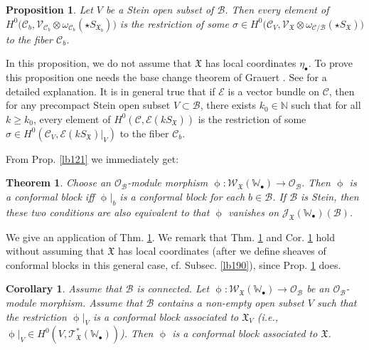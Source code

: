 \documentclass[12pt,a4paper,notitlepage]{article}
\theoremstyle{definition}
\theoremstyle{plain}
\newtheorem{thm}[df]{Theorem}
\newtheorem{pp}[df]{Proposition}
\newtheorem{co}[df]{Corollary}
\newcommand{\fk}{\mathfrak}
\newcommand{\mc}{\mathcal}
\newcommand{\scr}{\mathscr}
\newcommand{\SX}{{S_{\fk X}}}
\newcommand{\blt}{\bullet}
\newcommand{\Wbb}{\mathbb W}
\newcommand{\Nbb}{\mathbb N}
\newcommand{\SXb}{{S_{\fk X_b}}}
\numberwithin{equation}{section}
\begin{document}
\begin{pp}\label{lb122}
Let $V$ be a Stein open subset of $\mc B$. Then every element of $H^0\big(\mc C_b,\scr V_{\mc C_b}\otimes\omega_{\mc C_b}(\star\SXb)\big)$ is the restriction of some $\sigma\in H^0\big(\mc C_V,\scr V_{\fk X}\otimes\omega_{\mc C/\mc B}(\star\SX)\big)$ to the fiber $\mc C_b$.
\end{pp}


In this proposition, we do not assume that $\fk X$ has local coordinates $\eta_\blt$. To prove this proposition one needs the base change theorem of Grauert \cite[Sec. III.4.2]{GR-b}. See  \cite[Sec. 2.5]{Gui} for a detailed explanation. It is in general true that if $\scr E$ is a vector bundle on $\mc C$, then for any precompact Stein open subset $V\subset\mc B$, there exists $k_0\in\Nbb$ such that for all $k\geq k_0$, every element of $H^0(\mc C,\scr E(k\SX))$ is the restriction of some $\sigma \in H^0(\mc C_V,\scr E(k\SX)|_V)$ to the fiber $\mc C_b$.


From Prop. \ref{lb121} we immediately get:

\begin{thm}\label{lb143}
Choose an $\scr O_{\mc B}$-module morphism $\upphi:\scr W_{\fk X}(\Wbb_\blt)\rightarrow\scr O_{\mc B}$. Then $\upphi$ is a conformal block iff $\upphi|_b$ is a conformal block for each $b\in\mc B$. If $\mc B$ is Stein, then these two conditions are also equivalent to that $\upphi$ vanishes on $\scr J_{\fk X}(\Wbb_\blt)(\mc B)$.
\end{thm}


We give an application of Thm. \ref{lb143}. We remark that Thm. \ref{lb143} and Cor. \ref{lb158} hold without assuming that $\fk X$ has local coordinates (after we define sheaves of conformal blocks in this general case, cf. Subsec. \ref{lb190}), since Prop. \ref{lb122} does.



\begin{co}\label{lb158}
Assume that $\mc B$ is connected. Let $\upphi:\scr W_{\fk X}(\Wbb_\blt)\rightarrow\scr O_{\mc B}$ be an $\scr O_{\mc B}$-module morphism. Assume that $\mc B$ contains a non-empty open subset $V$ such that the restriction $\upphi|_V$ is a conformal block associated to $\fk X_V$ (i.e., $\upphi|_V\in H^0(V,\scr T_{\fk X}^*(\Wbb_\blt))$). Then $\upphi$ is a conformal block associated to $\fk X$.
\end{co}
\end{document}
